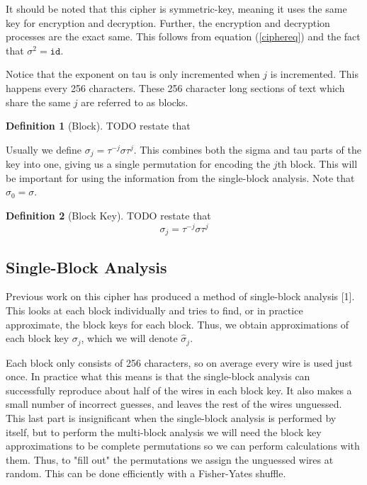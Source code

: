 \documentclass[12pt]{article}
\theoremstyle{definition}
\newtheorem{definition}{Definition}%
\theoremstyle{remark}
\theoremstyle{remark}
\begin{document}
\par
It should be noted that this cipher is symmetric-key, meaning it uses the same key for encryption and decryption. Further, the encryption and decryption processes are the exact same. This follows from equation (\ref{ciphereq}) and the fact that $\sigma^2=\texttt{id}$.

\par
Notice that the exponent on tau is only incremented when $j$ is incremented. This happens every 256 characters. These 256 character long sections of text which share the same $j$ are referred to as blocks.
\begin{definition}[Block]
	TODO restate that
\end{definition}

\par
Usually we define $\sigma_j = \tau^{-j} \sigma \tau^j$. This combines both the sigma and tau parts of the key into one, giving us a single permutation for encoding the $j$th block. This will be important for using the information from the single-block analysis. Note that $\sigma_0 = \sigma$.
\begin{definition}[Block Key]
	TODO restate that
	\begin{equation}
		\label{blockeq}
		\sigma_j = \tau^{-j} \sigma \tau^j
	\end{equation}
\end{definition}

\subsection{Single-Block Analysis}
\par
Previous work on this cipher has produced a method of single-block analysis [1]. This looks at each block individually and tries to find, or in practice approximate, the block keys for each block. Thus, we obtain approximations of each block key $\sigma_j$, which we will denote $\hat{\sigma}_j$. 
\par
Each block only consists of 256 characters, so on average every wire is used just once.
In practice what this means is that the single-block analysis can successfully reproduce about half of the wires in each block key. It also makes a small number of incorrect guesses, and leaves the rest of the wires unguessed. This last part is insignificant when the single-block analysis is performed by itself, but to perform the multi-block analysis we will need the block key approximations to be complete permutations so we can perform calculations with them. Thus, to "fill out" the permutations we assign the unguessed wires at random. This can be done efficiently with a Fisher-Yates shuffle.
\end{document}
